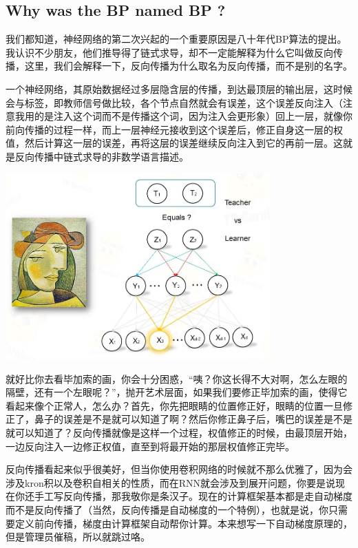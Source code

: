 \documentclass{article}
\begin{document}
\subsection{Why was the BP named BP ?}
我们都知道，神经网络的第二次兴起的一个重要原因是八十年代BP算法的提出。我认识不少朋友，他们推导得了链式求导，却不一定能解释为什么它叫做反向传播，这里，我们会解释一下，反向传播为什么取名为反向传播，而不是别的名字。

一个神经网络，其原始数据经过多层隐含层的传播，到达最顶层的输出层，这时候会与标签，即教师信号做比较，各个节点自然就会有误差，这个误差反向注入（注意我用的是注入这个词而不是传播这个词，因为注入会更形象）回上一层，就像你前向传播的过程一样，而上一层神经元接收到这个误差后，修正自身这一层的权值，然后计算这一层的误差，再将这层的误差继续反向注入到它的再前一层。这就是反向传播中链式求导的非数学语言描述。

\begin{center}
\includegraphics[width=4in]{image/image100.jpg}
\end{center}

就好比你去看毕加索的画，你会十分困惑，“咦？你这长得不大对啊，怎么左眼的隔壁，还有一个左眼呢？”，抛开艺术层面，如果我们要修正毕加索的画，使得它看起来像个正常人，怎么办？首先，你先把眼睛的位置修正好，眼睛的位置一旦修正了，鼻子的误差是不是就可以知道了啊？然后你修正鼻子后，嘴巴的误差是不是就可以知道了？反向传播就像是这样一个过程，权值修正的时候，由最顶层开始，一边反向注入一边修正权值，直至到将最开始的那层权值修正完毕。

反向传播看起来似乎很美好，但当你使用卷积网络的时候就不那么优雅了，因为会涉及kron积以及卷积自相关的性质，而在RNN就会涉及到展开问题，你要是说现在你还手工写反向传播，那我敬你是条汉子。现在的计算框架基本都是走自动梯度而不是反向传播了（当然，反向传播是自动梯度的一个特例），也就是说，你只需要定义前向传播，梯度由计算框架自动帮你计算。本来想写一下自动梯度原理的，但是管理员催稿，所以就跳过咯。
\end{document}

